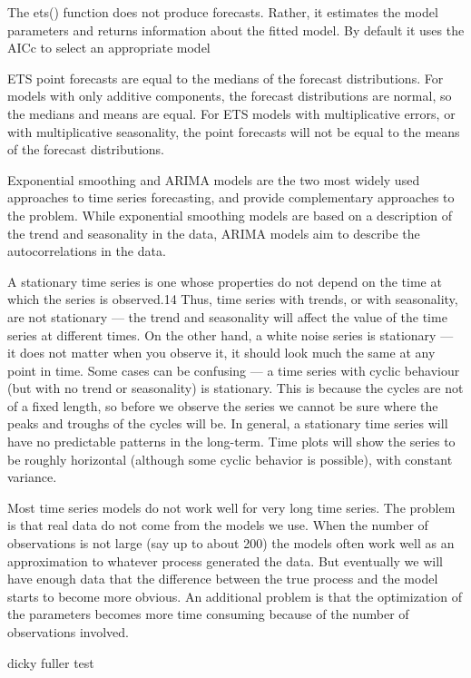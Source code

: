 \documentclass[]{book}
\begin{document}
The ets() function does not produce forecasts. Rather, it estimates the model parameters and returns information about the fitted model. By default it uses the AICc to select an appropriate model

ETS point forecasts are equal to the medians of the forecast distributions. For models with only additive components, the forecast distributions are normal, so the medians and means are equal. For ETS models with multiplicative errors, or with multiplicative seasonality, the point forecasts will not be equal to the means of the forecast distributions.

Exponential smoothing and ARIMA models are the two most widely used approaches to time series forecasting, and provide complementary approaches to the problem. While exponential smoothing models are based on a description of the trend and seasonality in the data, ARIMA models aim to describe the autocorrelations in the data.

A stationary time series is one whose properties do not depend on the time at which the series is observed.14 Thus, time series with trends, or with seasonality, are not stationary --- the trend and seasonality will affect the value of the time series at different times. On the other hand, a white noise series is stationary --- it does not matter when you observe it, it should look much the same at any point in time. Some cases can be confusing --- a time series with cyclic behaviour (but with no trend or seasonality) is stationary. This is because the cycles are not of a fixed length, so before we observe the series we cannot be sure where the peaks and troughs of the cycles will be. In general, a stationary time series will have no predictable patterns in the long-term. Time plots will show the series to be roughly horizontal (although some cyclic behavior is possible), with constant variance.

Most time series models do not work well for very long time series. The problem is that real data do not come from the models we use. When the number of observations is not large (say up to about 200) the models often work well as an approximation to whatever process generated the data. But eventually we will have enough data that the difference between the true process and the model starts to become more obvious. An additional problem is that the optimization of the parameters becomes more time consuming because of the number of observations involved.

dicky fuller test
\end{document}
